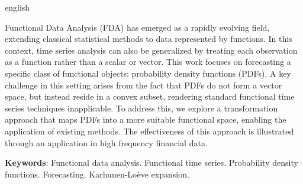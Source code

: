 \documentclass[
	12pt,				%
	oneside,			%
	a4paper,			%
	english,			%
	brazil				%
	]{abntex2ppgsi}
\begin{document}
% 
% 
\begin{resumo}[Abstract]
\begin{otherlanguage*}{english}

% 
%
%
%

Functional Data Analysis (FDA) has emerged as a rapidly evolving field, extending classical statistical methods to data represented by functions. In this context, time series analysis can also be generalized by treating each observation as a function rather than a scalar or vector. This work focuses on forecasting a specific class of functional objects: probability density functions (PDFs). A key challenge in this setting arises from the fact that PDFs do not form a vector space, but instead reside in a convex subset, rendering standard functional time series techniques inapplicable. To address this, we explore a transformation approach that maps PDFs into a more suitable functional space, enabling the application of existing methods. The effectiveness of this approach is illustrated through an application in high frequency financial data.

\textbf{Keywords}: Functional data analysis. Functional time series. Probability density functions. Forecasting. Karhunen-Loève expansion. 

\end{otherlanguage*}
\end{resumo}
\end{document}
